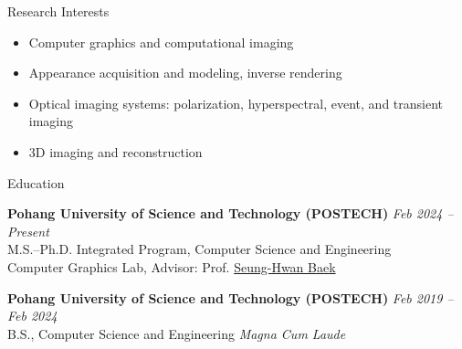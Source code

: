 \documentclass{cv}
\begin{document}
\begin{rSection}{Research Interests}
\begin{itemize}
\item Computer graphics and computational imaging
\item Appearance acquisition and modeling, inverse rendering
\item Optical imaging systems: polarization, hyperspectral, event, and transient imaging
\item 3D imaging and reconstruction
\end{itemize}
\end{rSection}

\begin{rSection}{Education}

{\bf Pohang University of Science and Technology (POSTECH)} \hfill {\em Feb 2024 -- Present}\\
M.S.--Ph.D. Integrated Program, Computer Science and Engineering\\
Computer Graphics Lab, Advisor: Prof. \href{https://www.shbaek.com}{Seung-Hwan Baek}

{\bf Pohang University of Science and Technology (POSTECH)} \hfill {\em Feb 2019 -- Feb 2024}\\
B.S., Computer Science and Engineering \hfill {\em Magna Cum Laude}

\end{rSection}
\end{document}
